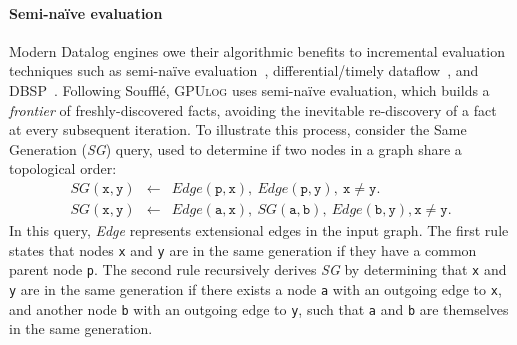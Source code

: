 \documentclass[nonacm,sigplan]{acmart}
\newcommand{\tool}{\textsc{GPUlog}}
\begin{document}


\paragraph*{Semi-na\"ive evaluation}
Modern Datalog engines owe their algorithmic benefits to incremental evaluation techniques such as semi-na\"ive evaluation~\cite{abiteboul1995foundations}, differential/timely dataflow~\cite{Naiad, mcsherry2013differential}, and DBSP~\cite{dbsp}. Following Souffl\'e, \tool{} uses semi-na\"ive evaluation, which builds a \emph{frontier} of freshly-discovered facts, avoiding the inevitable re-discovery of a fact at every subsequent iteration. To illustrate this process, consider the Same Generation (\emph{SG}) query, used to determine if two nodes in a graph share a topological order:
\[
\begin{array}{lcl}
    \textit{SG}(\texttt{x},\texttt{y}) & \leftarrow & \textit{Edge}(\texttt{p},\texttt{x}), ~ \textit{Edge}(\texttt{p}, \texttt{y}), ~ \texttt{x} \neq \texttt{y}. \\
    \textit{SG}(\texttt{x}, \texttt{y}) & \leftarrow & \textit{Edge}(\texttt{a}, \texttt{x}), ~ \textit{SG}(\texttt{a},\texttt{b}), ~ \textit{Edge}(\texttt{b},\texttt{y}), \texttt{x} \neq \texttt{y}.
\end{array}
\]
In this query, \textit{Edge} represents extensional edges in the input graph. The first rule states that nodes \texttt{x} and \texttt{y} are in the same generation if they have a common parent node \texttt{p}. The second rule recursively derives \textit{SG} by determining that \texttt{x} and \texttt{y} are in the same generation if there exists a node \texttt{a} with an outgoing edge to \texttt{x}, and another node \texttt{b} with an outgoing edge to \texttt{y}, such that \texttt{a} and \texttt{b} are themselves in the same generation.
\end{document}

